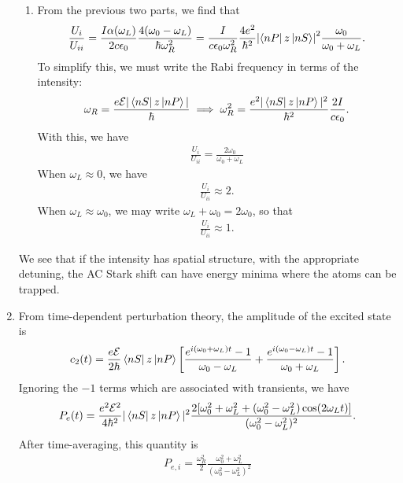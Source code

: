 \documentclass{article}
\theoremstyle{definition}
\newcommand{\al}{\alpha}
\newcommand{\f}[2]{\frac{#1}{#2}}
\newcommand{\lb}{\left[}
\newcommand{\rb}{\right]}
\begin{document}
\begin{enumerate}[label=(\alph*)]
\begin{enumerate}[label=(\roman*)]
		
		\item From the previous two parts, we find that
		\begin{align*}
		\f{U_i}{U_{ii}} = \f{I\al(\omega_L)}{2c\epsilon_0} \f{4(\omega_0 - \omega_L)}{\hbar \omega_R^2}  = \f{I}{c\epsilon_0 \omega_R^2 }\f{4e^2}{\hbar^2} \abs{\bra{nP} z \ket{nS}}^2 \f{\omega_0}{\omega_0 + \omega_L}.
		\end{align*}
		To simplify this, we must write the Rabi frequency in terms of the intensity:
		\begin{align*}
			\omega_R = \f{e\mathcal{E}|\bra{nS} z \ket{nP}|}{\hbar} \implies \omega_R^2 = \f{e^2|\bra{nS} z \ket{nP}|^2}{\hbar^2} \f{2I}{c\epsilon_0}.
		\end{align*}
		With this, we have
		\begin{align*}
			\boxed{\f{U_{i}}{U_{ii}} = \f{2\omega_0}{\omega_0 + \omega_L}}
		\end{align*}
		When $\omega_L \approx 0$, we have
		\begin{align*}
		\f{U_i}{U_{ii}} \approx 2.
		\end{align*}
		When $\omega_L \approx \omega_0$, we may write $\omega_L + \omega_0 = 2\omega_0$, so that
		\begin{align*}
		\f{U_i}{U_{ii}} \approx 1.
		\end{align*}
	\end{enumerate}
	We see that if the intensity has spatial structure, with the appropriate detuning, the AC Stark shift can have energy minima where the atoms can be trapped. 
	
	\item From time-dependent perturbation theory, the amplitude of the excited state is
	\begin{align*}
	c_2(t) =  \f{e\mathcal{E}}{2\hbar} \bra{nS} z \ket{nP} \lb \f{e^{i(\omega_0+\omega_L)t}-1}{\omega_0-\omega_L} + \f{e^{i(\omega_0-\omega_L)t}-1}{\omega_0+\omega_L} \rb.
	\end{align*}
	Ignoring the $-1$ terms which are associated with transients, we have
	\begin{align*}
		P_e(t) = \f{e^2\mathcal{E}^2}{4\hbar^2}|\bra{nS}z \ket{nP}|^2 \f{2[\omega_0^2+\omega_L^2+(\omega_0^2-\omega_L^2)\cos(2\omega_L t)]}{(\omega_0^2-\omega_L^2)^2}.
	\end{align*}
	After time-averaging, this quantity is 
	\begin{align*}
		P_{e,i} = \boxed{\f{\omega_R^2}{2} \f{\omega_0^2+\omega_L^2}{(\omega_0^2-\omega_L^2)^2}}
	\end{align*}



\end{enumerate}
\end{document}
